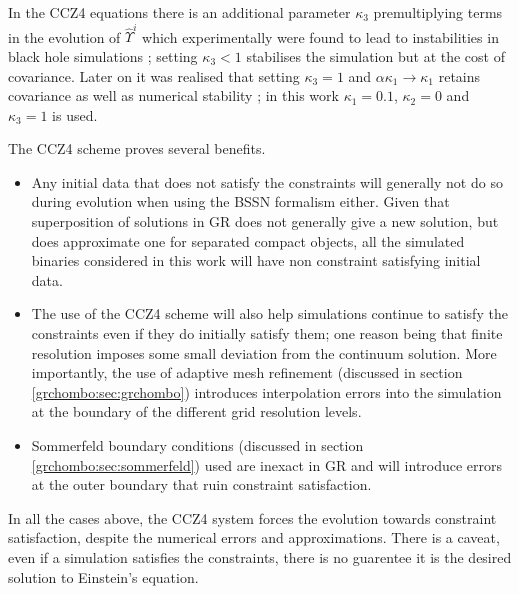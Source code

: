In the CCZ4 equations there is an additional parameter $\kappa_3$ premultiplying terms in the evolution of $\hat{\Upsilon}^i$ which experimentally were found to lead to instabilities in black hole simulations \cite{PhysRevD.85.064040}; setting $\kappa_3<1$ stabilises the simulation but at the cost of covariance. Later on it was realised that setting $\kappa_3=1$ and $\alpha\kappa_1\rightarrow\kappa_1$ retains covariance as well as numerical stability \cite{Alic:2013xsa}; in this work $\kappa_1=0.1$, $\kappa_2=0$ and $\kappa_3=1$ is used.


The CCZ4 scheme proves several benefits. 
\begin{itemize}
\item Any initial data that does not satisfy the constraints will generally not do so during evolution when using the BSSN formalism either. Given that superposition of solutions in GR does not generally give a new solution, but does approximate one for separated compact objects, all the simulated binaries considered in this work will have non constraint satisfying initial data. 
\item The use of the CCZ4 scheme will also help simulations continue to satisfy the constraints even if they do initially satisfy them; one reason being that finite resolution imposes some small deviation from the continuum solution. More importantly, the use of adaptive mesh refinement (discussed in section \ref{grchombo:sec:grchombo}) introduces interpolation errors into the simulation at the boundary of the different grid resolution levels. 
\item Sommerfeld boundary conditions (discussed in section \ref{grchombo:sec:sommerfeld}) used are inexact in GR and will introduce errors at the outer boundary that ruin constraint satisfaction. 
\end{itemize}
In all the cases above, the CCZ4 system forces the evolution towards constraint satisfaction, despite the numerical errors and approximations. There is a caveat, even if a simulation satisfies the constraints, there is no guarentee it is the desired solution to Einstein's equation. 




